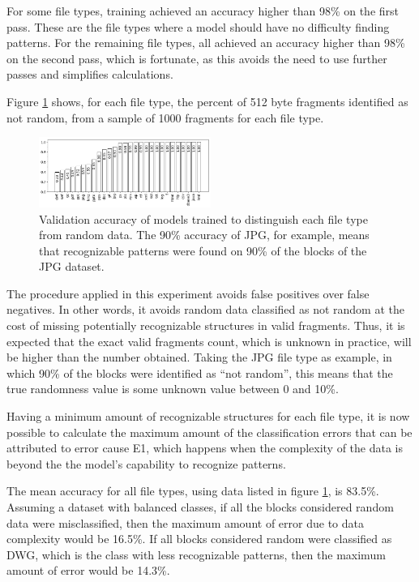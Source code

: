 For some file types, training achieved an accuracy higher than 98\% on the first pass. These are the file types where a model should have no difficulty finding patterns. For the remaining file types, all achieved an accuracy higher than 98\% on the second pass, which is fortunate, as this avoids the need to use further passes and  simplifies calculations.

Figure \ref{fig:not_random} shows, for each file type, the percent of 512 byte fragments identified as not random, from a sample of 1000 fragments for each file type.

\noindent
\begin{figure}[htb!]
\centering\includegraphics[width=0.50\textwidth]{content/random.png}
\caption{\label{fig:not_random}Validation accuracy of models trained to distinguish each file type from random data. The 90\% accuracy of JPG, for example, means that recognizable patterns were found on 90\% of the blocks of the JPG dataset.}%
\end{figure}



The procedure applied in this experiment avoids false positives over false negatives. In other words, it avoids random data classified as not random at the cost of missing potentially recognizable structures in valid fragments. Thus, it is expected that the exact valid fragments count, which is unknown in practice, will be higher than the number obtained. Taking the JPG file type as example, in which 90\% of the blocks were identified as ``not random'', this means that the true randomness value is some unknown value between 0 and 10\%.


Having a minimum amount of recognizable structures for each file type, it is now possible to calculate the maximum amount of the classification errors that can be attributed to error cause E1, which happens when the complexity of the data is beyond the the model's capability to recognize patterns.

The mean accuracy for all file types, using data listed in figure \ref{fig:not_random}, is 83.5\%. Assuming a dataset with balanced classes, if all the blocks considered random data were misclassified, then the maximum amount of error due to data complexity would be 16.5\%. If all blocks considered random were classified as DWG, which is the class with less recognizable patterns, then the maximum amount of error would be 14.3\%.

